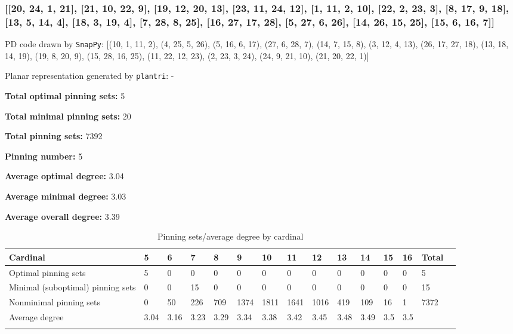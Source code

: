 \documentclass{article}%
\begin{document}
\newpage

\subsubsection{[[20, 24, 1, 21], [21, 10, 22, 9], [19, 12, 20, 13], [23, 11, 24, 12], [1, 11, 2, 10], [22, 2, 23, 3], [8, 17, 9, 18], [13, 5, 14, 4], [18, 3, 19, 4], [7, 28, 8, 25], [16, 27, 17, 28], [5, 27, 6, 26], [14, 26, 15, 25], [15, 6, 16, 7]]}

{\small\noindent PD code drawn by \texttt{SnapPy}: [(10, 1, 11, 2), (4, 25, 5, 26), (5, 16, 6, 17), (27, 6, 28, 7), (14, 7, 15, 8), (3, 12, 4, 13), (26, 17, 27, 18), (13, 18, 14, 19), (19, 8, 20, 9), (15, 28, 16, 25), (11, 22, 12, 23), (2, 23, 3, 24), (24, 9, 21, 10), (21, 20, 22, 1)]}

{\small\noindent Planar representation generated by \texttt{plantri}: -}

\begin{multicols}{2}
{\normalsize \noindent\textbf{Total optimal pinning sets:} 5

\noindent\textbf{Total minimal pinning sets:} 20

\noindent\textbf{Total pinning sets:} 7392

\noindent\textbf{Pinning number:} 5

}
\columnbreak

{\normalsize \noindent\textbf{Average optimal degree:} 3.04

\noindent\textbf{Average minimal degree:} 3.03

\noindent\textbf{Average overall degree:} 3.39

}
\end{multicols}

\begin{table}[ht]
	\caption{Pinning sets/average degree by cardinal}
	\centering
	\renewcommand{\arraystretch}{1.5}
	\begin{tabularx}{\textwidth}{lXXXXXXXXXXXXXX}
		\toprule
			Cardinal & 5 & 6 & 7 & 8 & 9 & 10 & 11 & 12 & 13 & 14 & 15 & 16 & Total\\
			\hline
			Optimal pinning sets & 5 & 0 & 0 & 0 & 0 & 0 & 0 & 0 & 0 & 0 & 0 & 0 & 5 \\
			Minimal (suboptimal) pinning sets & 0 & 0 & 15 & 0 & 0 & 0 & 0 & 0 & 0 & 0 & 0 & 0 & 15 \\
			Nonminimal pinning sets & 0 & 50 & 226 & 709 & 1374 & 1811 & 1641 & 1016 & 419 & 109 & 16 & 1 & 7372 \\
			Average degree & 3.04 & 3.16 & 3.23 & 3.29 & 3.34 & 3.38 & 3.42 & 3.45 & 3.48 & 3.49 & 3.5 & 3.5 &  \\
		\bottomrule \\ 
	\end{tabularx}
\end{table}
\end{document}
